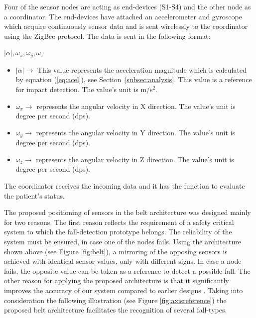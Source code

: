 \documentclass[review]{elsarticle}
\begin{document}
Four of the sensor nodes are acting as end-devices (S1-S4) and the other node as a coordinator. 
The end-devices have attached an accelerometer and gyroscope which acquire continuously sensor 
data and is sent wirelessly to the coordinator using the ZigBee protocol. The data is sent in the following format:
 \begin{center}
  $|\alpha|, \omega_{x}, \omega_{y}, \omega_{z}$
 \end{center}
\begin{itemize}
  \item $|\alpha| \rightarrow$ This value
    represents the acceleration magnitude which is calculated  
  by equation (\ref{eq:acel}), see Section~\ref{subsec:analysis}. This value is a reference for impact detection. 
  The value's unit is m/s$^2$.
  \item $\omega_{x} \rightarrow$ represents the angular velocity in X direction. The value's unit is 
  degree per second (dps).
  \item $\omega_{y} \rightarrow$ represents the angular velocity in Y direction. The value's unit is 
  degree per second (dps).
  \item $\omega_{z} \rightarrow$ represents the angular velocity in Z direction. The value's unit is degree per second (dps).
\end{itemize}
The coordinator receives the incoming data and it has the function to evaluate the patient's status.

The proposed positioning of sensors in the belt architecture was
designed mainly for two reasons. The first reason  
reflects the requirement of a safety critical system to which the
fall-detection prototype belongs. The reliability  
of the system must be ensured, in case one of the nodes fails. Using
the architecture shown above (see Figure \ref{fig:belt}),  
a mirroring of the opposing sensors is achieved with identical sensor values, only with different signs. 
In case a node fails, the opposite value can be taken as a reference to detect a possible fall. The other reason for 
applying the proposed architecture is that it significantly improves
the accuracy of our system compared to earlier designs \cite{LuigiMasterThesis}. Taking into 
consideration the following illustration (see Figure \ref{fig:axisreference}) the proposed belt architecture facilitates the recognition of several fall-types.
\end{document}
